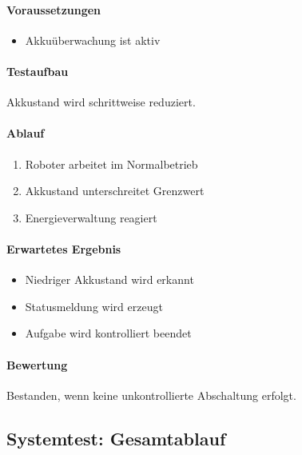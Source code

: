 \documentclass[
  a4paper,
  12pt,
  DIV=12,        %
  parskip=half,  %
  headings=small %
]{scrartcl}
\theoremstyle{definition}
\providecommand{\tightlist}{%
  \setlength{\itemsep}{0pt}\setlength{\parskip}{0pt}}
\theoremstyle{definition}
\begin{document}
\paragraph{Voraussetzungen}\label{voraussetzungen-31}

\begin{itemize}
\tightlist
\item
  Akkuüberwachung ist aktiv
\end{itemize}

\paragraph{Testaufbau}\label{testaufbau-8}

Akkustand wird schrittweise reduziert.

\paragraph{Ablauf}\label{ablauf-32}

\begin{enumerate}
\def\labelenumi{\arabic{enumi}.}
\tightlist
\item
  Roboter arbeitet im Normalbetrieb
\item
  Akkustand unterschreitet Grenzwert
\item
  Energieverwaltung reagiert
\end{enumerate}

\paragraph{Erwartetes Ergebnis}\label{erwartetes-ergebnis-32}

\begin{itemize}
\tightlist
\item
  Niedriger Akkustand wird erkannt
\item
  Statusmeldung wird erzeugt
\item
  Aufgabe wird kontrolliert beendet
\end{itemize}

\paragraph{Bewertung}\label{bewertung-32}

Bestanden, wenn keine unkontrollierte Abschaltung erfolgt.

\subsection{Systemtest: Gesamtablauf}\label{systemtest-gesamtablauf}
\end{document}
